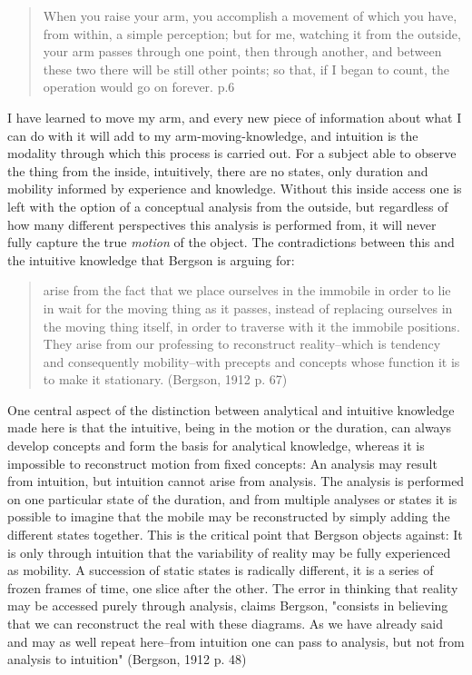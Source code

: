 \documentclass[11pt]{article}
\makeatletter
\newcommand{\citeprocitem}[2]{\hyper@linkstart{cite}{citeproc_bib_item_#1}#2\hyper@linkend}
\makeatother
\begin{document}
\begin{quote}
When you raise your arm, you accomplish a movement of which you have, from within, a simple perception; but for me, watching it from the outside, your arm passes through one point, then through another, and between these two there will be still other points; so that, if I began to count, the operation would go on forever. p.6
\end{quote}

I have learned to move my arm, and every new piece of information about what I can do with it will add to my arm-moving-knowledge, and intuition is the modality through which this process is carried out. For a subject able to observe the thing from the inside, intuitively, there are no states, only duration and mobility informed by experience and knowledge.  
Without this inside access one is left with the option of a conceptual analysis from the outside, but regardless of how many different perspectives this analysis is performed from, it will never fully capture the true \emph{motion} of the object.
The contradictions between this and the intuitive knowledge that Bergson is arguing for:

\begin{quote}
arise from the fact that we place ourselves in the immobile in order to lie in wait for the moving thing as it passes, instead of replacing ourselves in the moving thing itself, in order to traverse with it the immobile positions. They arise from our professing to reconstruct reality--which is tendency and consequently mobility--with precepts and concepts whose function it is to make it stationary. (\citeprocitem{2}{Bergson, 1912} p. 67)
\end{quote}

One central aspect of the distinction between analytical and intuitive knowledge made here is that the intuitive, being in the motion or the duration, can always develop concepts and form the basis for analytical knowledge, whereas it is impossible to reconstruct motion from fixed concepts: An analysis may result from intuition, but intuition cannot arise from analysis. The analysis is performed on one particular state of the duration, and from multiple analyses or states it is possible to imagine that the mobile may be reconstructed by simply adding the different states together. This is the critical point that Bergson objects against: It is only through intuition that the variability of reality may be fully experienced as mobility. A succession of static states is radically different, it is a series of frozen frames of time, one slice after the other. The error in thinking that reality may be accessed purely through analysis, claims Bergson, "consists in believing that we can reconstruct the real with these diagrams. As we have already said and may as well repeat here--from intuition one can pass to analysis, but not from analysis to intuition" (\citeprocitem{2}{Bergson, 1912} p. 48) 
\end{document}
